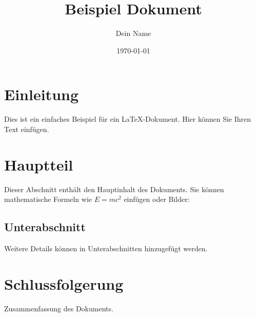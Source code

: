 \documentclass{article}
\title{Beispiel Dokument}
\author{Dein Name}
\date{\today}
\begin{document}
\maketitle %

\section{Einleitung}
Dies ist ein einfaches Beispiel für ein LaTeX-Dokument.
Hier können Sie Ihren Text einfügen.

\section{Hauptteil}
Dieser Abschnitt enthält den Hauptinhalt des Dokuments.
Sie können mathematische Formeln wie $E=mc^2$ einfügen oder Bilder:

\subsection{Unterabschnitt}
Weitere Details können in Unterabschnitten hinzugefügt werden.

\section{Schlussfolgerung}
Zusammenfassung des Dokuments.
\end{document}
